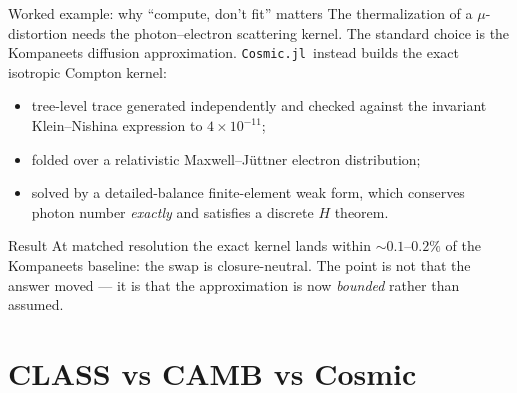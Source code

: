 \documentclass[10pt,aspectratio=43]{beamer}
\newcommand{\Cosmic}{\textcolor{cdeep}{\texttt{Cosmic.jl}}}
\begin{document}
\begin{frame}{Worked example: why ``compute, don't fit'' matters}
  The thermalization of a $\mu$-distortion needs the photon--electron
  scattering kernel. The standard choice is the \alert{Kompaneets} diffusion
  approximation.
  \vfill
  \Cosmic\ instead builds the exact isotropic Compton kernel:
  \begin{itemize}
    \item tree-level trace generated independently and checked against the
      invariant Klein--Nishina expression to $4\times10^{-11}$;
    \item folded over a relativistic Maxwell--J\"uttner electron distribution;
    \item solved by a detailed-balance finite-element weak form, which conserves
      photon number \emph{exactly} and satisfies a discrete $H$ theorem.
  \end{itemize}
  \vfill
  \begin{block}{Result}
    At matched resolution the exact kernel lands within $\sim0.1$--$0.2\%$ of
    the Kompaneets baseline: the swap is closure-neutral. The point is not that
    the answer moved --- it is that the approximation is now \emph{bounded}
    rather than assumed.
  \end{block}
\end{frame}

\section{CLASS vs CAMB vs Cosmic}
\end{document}
